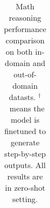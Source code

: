 \begin{table}[ht]
\begin{tabular}{lccccc}
\bottomrule
\end{tabular}
\caption{Math reasoning performance comparison on both in-domain and out-of-domain datasts. $^\dagger$~means the model is finetuned to generate step-by-step outputs. All results are in zero-shot setting.}
\label{tab:main_DVO_math.result}
\end{table}
